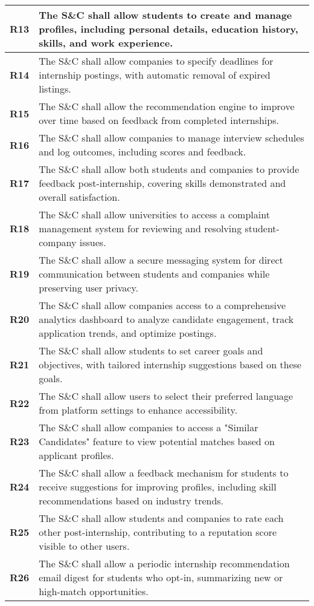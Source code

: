 \begin{longtable}{|p{}|p{}|}
\textbf{R13} & The S\&C shall allow students to create and manage profiles, including personal details, education history, skills, and work experience. \\ 
\hline
\textbf{R14} & The S\&C shall allow companies to specify deadlines for internship postings, with automatic removal of expired listings. \\ 
\hline
\textbf{R15} & The S\&C shall allow the recommendation engine to improve over time based on feedback from completed internships. \\ 
\hline
\textbf{R16} & The S\&C shall allow companies to manage interview schedules and log outcomes, including scores and feedback. \\ 
\hline
\textbf{R17} & The S\&C shall allow both students and companies to provide feedback post-internship, covering skills demonstrated and overall satisfaction. \\ 
\hline
\textbf{R18} & The S\&C shall allow universities to access a complaint management system for reviewing and resolving student-company issues. \\ 
\hline
\textbf{R19} & The S\&C shall allow a secure messaging system for direct communication between students and companies while preserving user privacy. \\ 
\hline
\textbf{R20} & The S\&C shall allow companies access to a comprehensive analytics dashboard to analyze candidate engagement, track application trends, and optimize postings. \\ 
\hline
\textbf{R21} & The S\&C shall allow students to set career goals and objectives, with tailored internship suggestions based on these goals. \\ 
\hline
\textbf{R22} & The S\&C shall allow users to select their preferred language from platform settings to enhance accessibility. \\ 
\hline
\textbf{R23} & The S\&C shall allow companies to access a "Similar Candidates" feature to view potential matches based on applicant profiles. \\ 
\hline
\textbf{R24} & The S\&C shall allow a feedback mechanism for students to receive suggestions for improving profiles, including skill recommendations based on industry trends. \\ 
\hline
\textbf{R25} & The S\&C shall allow students and companies to rate each other post-internship, contributing to a reputation score visible to other users. \\ 
\hline
\textbf{R26} & The S\&C shall allow a periodic internship recommendation email digest for students who opt-in, summarizing new or high-match opportunities. \\ 

\end{longtable}
